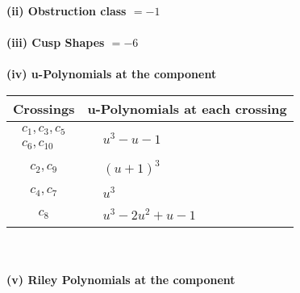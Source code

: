 \documentclass[1p]{elsarticle_modified}
\theoremstyle{definition}
\begin{document}
\flushleft \textbf{(ii) Obstruction class $= -1$}\\~\\
\flushleft \textbf{(iii) Cusp Shapes $= -6$}\\~\\
\newpage\renewcommand{\arraystretch}{1}
\flushleft \textbf{(iv) u-Polynomials at the component}\newline \\
\begin{tabular}{m{50pt}|m{274pt}}
Crossings & \hspace{64pt}u-Polynomials at each crossing \\
\hline $$\begin{aligned}c_{1},c_{3},c_{5}\\c_{6},c_{10}\end{aligned}$$&$\begin{aligned}
&u^3- u-1
\end{aligned}$\\
\hline $$\begin{aligned}c_{2},c_{9}\end{aligned}$$&$\begin{aligned}
&(u+1)^3
\end{aligned}$\\
\hline $$\begin{aligned}c_{4},c_{7}\end{aligned}$$&$\begin{aligned}
&u^3
\end{aligned}$\\
\hline $$\begin{aligned}c_{8}\end{aligned}$$&$\begin{aligned}
&u^3-2 u^2+u-1
\end{aligned}$\\
\hline
\end{tabular}\\~\\
\newpage\renewcommand{\arraystretch}{1}
\flushleft \textbf{(v) Riley Polynomials at the component}\newline \\
\end{document}
